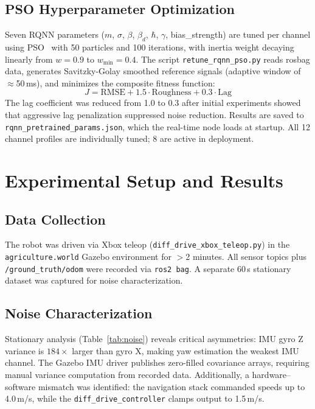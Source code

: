 \documentclass[conference]{IEEEtran}
\begin{document}
\subsection{PSO Hyperparameter Optimization}

Seven RQNN parameters ($m$, $\sigma$, $\beta$, $\beta_d$, $\hbar$, $\gamma$,
bias\_strength) are tuned per channel using PSO~\cite{pso} with 50 particles and
100 iterations, with inertia weight decaying linearly from $w = 0.9$ to $w_{\min}
= 0.4$. The script \texttt{retune\_rqnn\_pso.py} reads rosbag data, generates
Savitzky-Golay smoothed reference signals (adaptive window of $\approx$50\,ms), and
minimizes the composite fitness function:
\begin{equation}
  J = \mathrm{RMSE} + 1.5 \cdot \mathrm{Roughness} + 0.3 \cdot \mathrm{Lag}
\end{equation}
The lag coefficient was reduced from 1.0 to 0.3 after initial experiments showed
that aggressive lag penalization suppressed noise reduction. Results are saved to
\texttt{rqnn\_pretrained\_params.json}, which the real-time node loads at startup.
All 12 channel profiles are individually tuned; 8 are active in deployment.

\section{Experimental Setup and Results}

\subsection{Data Collection}

The robot was driven via Xbox teleop (\texttt{diff\_drive\_xbox\_teleop.py}) in the
\texttt{agriculture.world} Gazebo environment for $>$2 minutes. All sensor topics
plus \texttt{/ground\_truth/odom} were recorded via \texttt{ros2 bag}. A separate
60\,s stationary dataset was captured for noise characterization.

\subsection{Noise Characterization}

Stationary analysis (Table~\ref{tab:noise}) reveals critical asymmetries: IMU gyro
Z variance is $184\times$ larger than gyro X, making yaw estimation the weakest IMU
channel. The Gazebo IMU driver publishes zero-filled covariance arrays, requiring
manual variance computation from recorded data. Additionally, a hardware--software
mismatch was identified: the navigation stack commanded speeds up to 4.0\,m/s,
while the \texttt{diff\_drive\_controller} clamps output to 1.5\,m/s.
\end{document}
